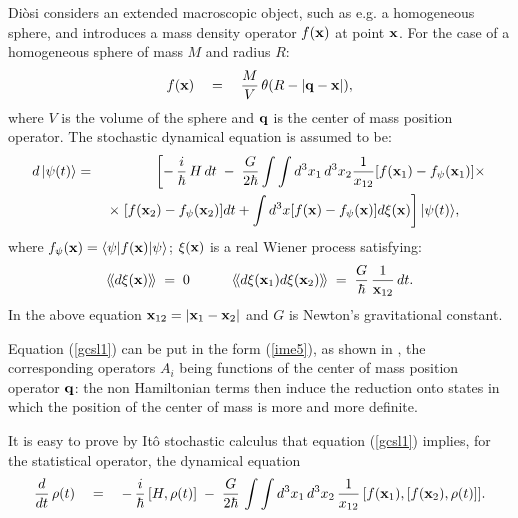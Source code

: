 \documentclass[10pt,a4paper]{article}
\newcommand{\llangle}{\langle\!\langle}
\newcommand{\rrangle}{\rangle\!\rangle}
\begin{document}
Di\`osi considers an extended macroscopic object, such as e.g. a
homogeneous sphere, and introduces a mass density operator $f({\bf
x})$ at point ${\bf x}$. For the case of a homogeneous sphere of
mass $M$ and radius $R$:
\begin{equation} \label{jdt}
f({\bf x}) \quad = \quad \frac{M}{V}\, \theta(R - |{\bf q} - {\bf
x}|),
\end{equation}
where $V$ is the volume of the sphere and ${\bf q}$ is the center
of mass position operator. The stochastic dynamical equation is
assumed to be:
\begin{eqnarray} \label{gcsl1}
d\,|\psi(t)\rangle & = & \left[ -\,\frac{i}{\hbar}\,H\, dt \; - \;
\frac{G}{2\hbar} \int\int d^{3} x_{1}\, d^{3} x_{2}
\frac{1}{x_{12}} [f({\bf x}_{1}) - f_{\psi}({\bf x}_{1})] \times
\right. \nonumber \\
& & \; \times\left. [f({\bf x}_{2}) - f_{\psi}({\bf x}_{2})] dt  +
\int d^{3} x [f({\bf x}) - f_{\psi}({\bf x})] d\xi ({\bf x})
\right] |\psi(t)\rangle, \qquad
\end{eqnarray}
where $f_{\psi}({\bf x}) = \langle\psi|f({\bf x})| \psi\rangle$;
$\xi({\bf x})$ is a real Wiener process satisfying:
\begin{equation}
\llangle d\xi({\bf x}) \rrangle \; = \; 0 \qquad \quad \llangle
d\xi({\bf x}_{1}) d\xi({\bf x}_{2}) \rrangle \; = \;
\frac{G}{\hbar}\, \frac{1}{{\bf x}_{12}}\, dt.
\end{equation}
In the above equation ${\bf x}_{12} = |{\bf x}_{1} - {\bf x}_{2}|$
and $G$ is Newton's gravitational constant.

Equation (\ref{gcsl1}) can be put in the form (\ref{ime5}), as
shown in \cite{ggrg}, the corresponding operators $A_{i}$ being
functions of the center of mass position operator ${\bf q}$: the
non Hamiltonian terms then induce the reduction onto states in
which the position of the center of mass is more and more
definite.

It is easy to prove by It\^o stochastic calculus that equation
(\ref{gcsl1}) implies, for the statistical operator, the dynamical
equation
\begin{equation} \label{gcsl2}
\frac{d}{dt}\, \rho(t) \quad = \quad -\, \frac{i}{\hbar}\, [H,
\rho(t)] \; - \; \frac{G}{2\hbar}\, \int\int d^{3} x_{1}\, d^{3}
x_{2}\, \frac{1}{x_{12}}\, [f({\bf x}_{1}), [ f({\bf x}_{2}),
\rho(t)]].
\end{equation}
\end{document}
